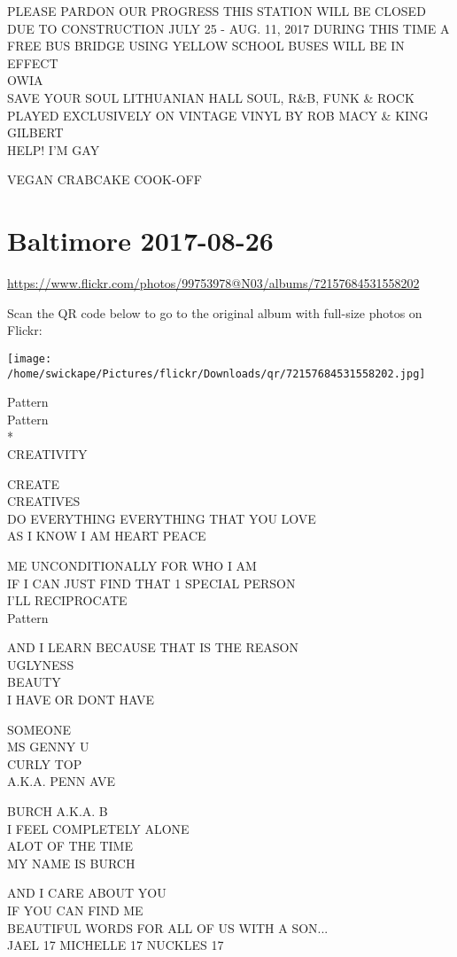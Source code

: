 \documentclass[10pt,letterpaper]{article}
\begin{document}
PLEASE PARDON OUR PROGRESS THIS STATION WILL BE CLOSED DUE TO CONSTRUCTION JULY 25 {-} AUG. 11, 2017 DURING THIS TIME A FREE BUS BRIDGE USING YELLOW SCHOOL BUSES WILL BE IN EFFECT\\
OWIA\\
SAVE YOUR SOUL LITHUANIAN HALL SOUL, R\&B, FUNK \& ROCK PLAYED EXCLUSIVELY ON VINTAGE VINYL BY ROB MACY \& KING GILBERT\\
HELP!  I'M GAY

VEGAN CRABCAKE COOK{-}OFF


\section*{Baltimore 2017-08-26}

\url{https://www.flickr.com/photos/99753978@N03/albums/72157684531558202}

Scan the QR code below to go to the original album with full-size photos on Flickr:

\texttt{[image: /home/swickape/Pictures/flickr/Downloads/qr/72157684531558202.jpg]}


Pattern\\
Pattern\\
*\\
CREATIVITY

CREATE\\
CREATIVES\\
DO EVERYTHING EVERYTHING THAT YOU LOVE\\
AS I KNOW I AM HEART PEACE

ME UNCONDITIONALLY FOR WHO I AM\\
IF I CAN JUST FIND THAT 1 SPECIAL PERSON\\
I'LL RECIPROCATE\\
Pattern

AND I LEARN BECAUSE THAT IS THE REASON\\
UGLYNESS\\
BEAUTY\\
I HAVE OR DONT HAVE

SOMEONE\\
MS GENNY U\\
CURLY TOP\\
A.K.A. PENN AVE

BURCH A.K.A. B\\
I FEEL COMPLETELY ALONE\\
ALOT OF THE TIME\\
MY NAME IS BURCH

AND I CARE ABOUT YOU\\
IF YOU CAN FIND ME\\
BEAUTIFUL WORDS FOR ALL OF US WITH A SON...\\
JAEL 17 MICHELLE 17 NUCKLES 17
\end{document}
